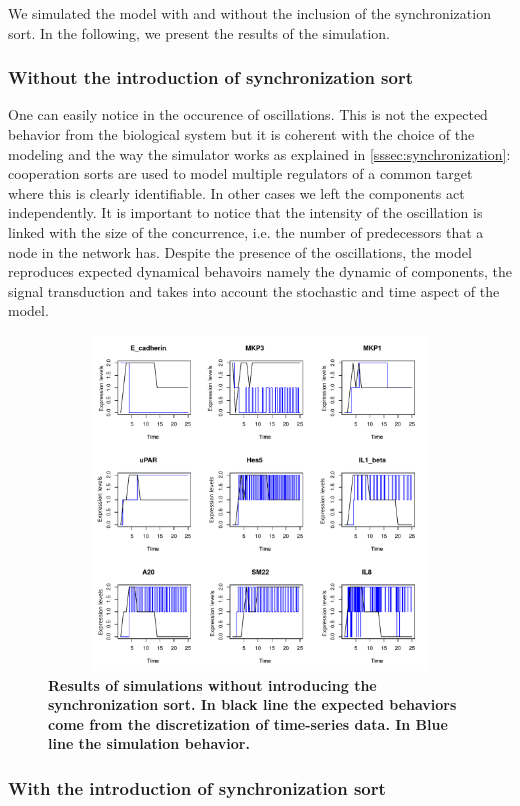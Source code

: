 We simulated the model with and without the inclusion of the synchronization sort. In the following, we present the results of 
the simulation.

\subsubsection{Without the introduction of synchronization sort}
One can easily notice in  the occurence of oscillations. This is not the expected behavior from the biological system
but it is coherent with the choice of the modeling and the way the simulator works as explained in \ref{sssec:synchronization}: cooperation
sorts are used to model multiple regulators of a common target
where this is clearly identifiable. In other cases we left the components act independently.
It is important to notice that the intensity of the oscillation is linked with 
the size of the concurrence, i.e. the number of predecessors that a node in the network has.
Despite the presence of the oscillations, the model reproduces expected dynamical behavoirs  namely
the dynamic of components, the signal transduction and takes into account the stochastic and time aspect of the model.

\begin{figure}[!t]
\centering
\includegraphics[width=6.5in,height=3.5in]{images/resultWOS.pdf}
\caption{\bf Results of simulations without introducing the synchronization sort. In black line the expected behaviors
come from the discretization of time-series data. In Blue line the simulation behavior.}
\label{fig:rwos}
\end{figure}
\subsubsection{With the introduction of synchronization sort}

